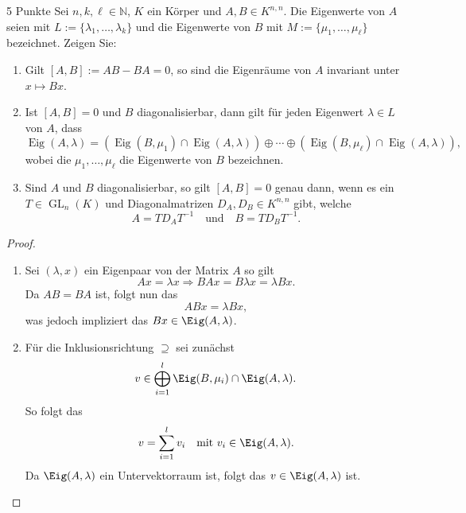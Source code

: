 \documentclass{problemset}
\author{Michael van Straten}
\begin{document}
\maketitle

\begin{problem}{5 Punkte}
Sei $n, k, \ell \in \mathbb{N}$, $K$ ein Körper und $A, B \in K^{n,n}$. Die
Eigenwerte von $A$ seien mit $L := \{\lambda_1, \ldots, \lambda_k\}$ und die
Eigenwerte von $B$ mit $M := \{\mu_1, \ldots, \mu_\ell\}$ bezeichnet. Zeigen
Sie:
\begin{enumerate}
    \item \label{eigenspace:invariant} Gilt $[A, B] := AB - BA = 0$, so sind die Eigenräume von $A$
          invariant unter $x \mapsto Bx$.
    \item \label{common-eigenvectors} Ist $[A, B] = 0$ und $B$ diagonalisierbar, dann gilt für jeden
          Eigenwert $\lambda \in L$ von $A$, dass
          \[
              \operatorname{Eig}(A, \lambda) = (\operatorname{Eig}(B, \mu_1) \cap \operatorname{Eig}(A, \lambda)) \oplus \cdots \oplus (\operatorname{Eig}(B, \mu_\ell) \cap \operatorname{Eig}(A, \lambda)),
          \]
          wobei die $\mu_1, \ldots, \mu_\ell$ die Eigenwerte von $B$ bezeichnen.
    \item Sind $A$ und $B$ diagonalisierbar, so gilt $[A, B] = 0$ genau dann, wenn es ein
          $T \in \operatorname{GL}_n(K)$ und Diagonalmatrizen $D_A, D_B \in K^{n,n}$
          gibt, welche
          \[
              A = T D_A T^{-1} \quad \text{und} \quad B = T D_B T^{-1}.
          \]
\end{enumerate}

\begin{proof}
    \leavevmode
    \begin{enumerate}
        \item Sei \((\lambda, x)\) ein Eigenpaar von der Matrix \(A\) so gilt
              \begin{equation*}
                  A x = \lambda x \Rightarrow B A x = B \lambda x = \lambda B x.
              \end{equation*}
              Da \(AB = BA\) ist, folgt nun das
              \begin{equation*}
                  A B x = \lambda B x,
              \end{equation*} was jedoch impliziert das \(Bx \in \Eig(A, \lambda)\).

        \item Für die Inklusionsrichtung \(\supseteq\) sei zunächst
              \begin{equation*}
                  v \in \mathop{\bigoplus}_{i=1}^l \Eig(B, \mu_i) \cap \Eig(A, \lambda).
              \end{equation*}
              So folgt das
              \begin{equation*}
                  v = \sum_{i = 1}^{l} v_i \quad \text{mit } v_i \in \Eig(A, \lambda).
              \end{equation*}
              Da \(\Eig(A, \lambda)\) ein Untervektorraum ist, folgt das \(v \in \Eig(A, \lambda)\) ist.


\end{enumerate}
\end{proof}
\end{problem}
\end{document}
